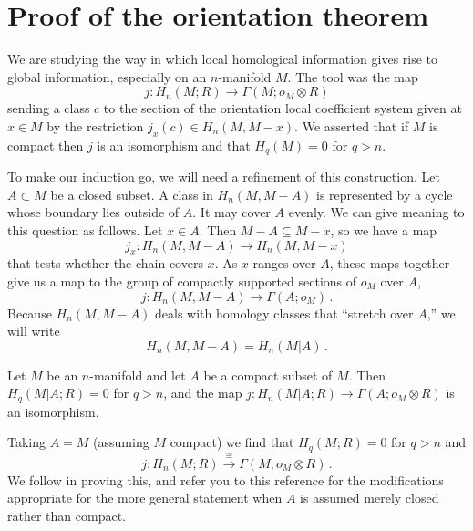 \section{Proof of the orientation theorem}

We are studying the way in which local homological information gives rise
to global information, especially on an $n$-manifold $M$. The tool was the map
\[
j:H_n(M;R)\to\Gamma(M;o_M\otimes R)
\]
sending a class $c$ to the section of the orientation local coefficient
system given at $x\in M$ by the restriction $j_x(c)\in H_n(M,M-x)$. 
We asserted that if $M$ is compact then $j$ is an isomorphism and that
$H_q(M)=0$ for $q>n$. 

To make our induction go, we will need a refinement of this construction.
Let $A\subset M$ be a closed subset. A class in
$H_n(M,M-A)$ is represented by a cycle whose boundary lies outside of $A$. 
It may cover $A$ evenly. We can give meaning to this question as follows.
Let $x\in A$. Then $M-A\subseteq M-x$, so we have a map
\[
j_x:H_n(M,M-A)\to H_n(M,M-x)
\]
that tests whether the chain covers $x$. As $x$ ranges over $A$, 
these maps together give us a map to the group of compactly supported 
sections of $o_M$ over $A$,
\[
j:H_n(M,M-A)\to\Gamma(A;o_M)\,.
\]
Because $H_n(M,M-A)$ deals with homology classes that ``stretch over $A$,''
we will write
\[
H_n(M,M-A)=H_n(M|A)\,.
\]
\begin{theorem} Let $M$ be an $n$-manifold and let $A$ be a compact subset 
of $M$. Then $H_q(M|A;R)=0$ for $q>n$, and the map 
$j:H_n(M|A;R)\to\Gamma(A;o_M\otimes R)$ is an isomorphism.
\label{thm-fundamental-class}
\end{theorem}
Taking $A=M$ (assuming $M$ compact) we find that $H_q(M;R)=0$ for $q>n$ and 
\[
j:H_n(M;R)\xrightarrow{\cong}\Gamma(M;o_M\otimes R)\,.
\]
We follow \cite{bredon} in proving this, 
and refer you to this reference for the modifications appropriate for
the more general statement when $A$ is assumed merely closed rather than
compact.

